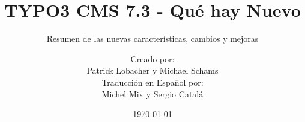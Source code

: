 %
%
%

\documentclass[t]{beamer}

\beamertemplatenavigationsymbolsempty

{
	\usetheme{typo3slides}
}

\title{TYPO3 CMS 7.3 - Qué hay Nuevo}
\subtitle{Resumen de las nuevas características, cambios y mejoras}
\author{
	\centerline{Creado por:}
	\centerline{Patrick Lobacher y Michael Schams}
	\vspace{0.4cm}
	\centerline{Traducción en Español por:}
	\centerline{Michel Mix y Sergio Catalá}
}

\date{\today}



\sharefont


\begingroup
	[default]
	\begin{frame}
		\titlepage
	\end{frame}
\endgroup


\section*{TYPO3 CMS 7.3 - Qué hay Nuevo}
\begin{frame}[fragile]
	\frametitle{Resumen de Capítulos}
	\framesubtitle{Resumen de Capítulos}

	\begin{multicols}{2}
		\tableofcontents
	\end{multicols}

\end{frame}

